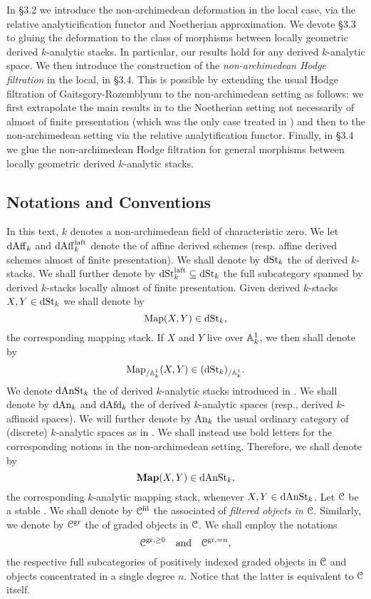 \documentclass[10pt,a4paper,reqno]{amsart} %
\theoremstyle{plain}
\theoremstyle{definition}
\theoremstyle{remark}
\numberwithin{equation}{section}
\begin{document}
In \S 3.2 we introduce the non-archimedean deformation in the local case, via the relative analyticification functor and Noetherian approximation. We
devote \S 3.3 to gluing the deformation to the class of morphisms between locally geometric derived $k$-analytic stacks. In particular, our results hold for any derived $k$-analytic space.
We then introduce the construction of the \emph{non-archimedean Hodge filtration} in the local, in \S 3.4. This is possible by extending the usual Hodge filtration of
Gaitsgory-Rozemblyum to the non-archimedean setting as follows: we first extrapolate the main results in \cite[\S 9.5]{Gaitsgory_Study_II} to the Noetherian setting
not necessarily of almost of finite presentation (which was the only case treated in \cite[\S 9]{Gaitsgory_Study_II}) and then to the non-archimedean setting via the relative analytification functor.
Finally, in \S 3.4 we glue the non-archimedean Hodge filtration for general morphisms between locally geometric derived $k$-analytic stacks.

\subsection{Notations and Conventions} In this text, $k$ denotes a non-archimedean field of characteristic zero. We let $\mathrm{dAff}_k$ and $\mathrm{dAff}_k^{\mathrm{laft}}$ denote
the \infcats of affine derived schemes (resp. affine derived schemes almost of finite presentation).
We shall denote by $\mathrm{dSt}_k$ the \infcat of derived $k$-stacks. 
We shall further denote by $\mathrm{dSt}^{\mathrm{laft}}_k \subseteq \mathrm{dSt}_k$ the full subcategory spanned by derived $k$-stacks locally almost of finite presentation.
Given derived $k$-stacks $X, Y \in \mathrm{dSt}_k$ we shall denote by
    \[
        \operatorname{Map}(X, Y) \in \mathrm{dSt}_k,    
    \]
the corresponding mapping stack. If $X$ and $Y$ live over $\mathbb A_k^1$, we then shall denote by
    \[
        \operatorname{Map}_{/ \mathbb A^1_k}(X, Y) \in (\mathrm{dSt}_k)_{/ \mathbb A^1_k}.  
    \]
We denote $\mathrm{dAnSt}_k$ the \infcat of derived $k$-analytic stacks introduced in \cite{Porta_Yu_Derived_non-archimedean_analytic_spaces}.
We shall denote by $\mathrm{dAn}_k$ and $\mathrm{dAfd}_k$ the \infcats of derived $k$-analytic spaces (resp., derived $k$-affinoid spaces). We will
further denote by $\mathrm{An}_k$ the usual ordinary category of (discrete) $k$-analytic spaces as in \cite{Berkovich_Etale_1993}.
We shall instead use bold letters for the corresponding notions in the non-archimedean setting. Therefore, we shall denote by
    \[
        \mathbf{Map}(X, Y) \in \mathrm{dAnSt}_k,
    \]
the corresponding $k$-analytic mapping stack, whenever $X, Y \in \mathrm{dAnSt}_k$.
Let $\mathcal C$ be a stable \infcat. We shall denote by $\mathcal C^{\mathrm{fil}}$ the associated \infcat of \emph{filtered objects in $\mathcal C$}.
Similarly, we denote by $\mathcal C^{\mathrm{gr}}$ the \infcat of graded objects in $\mathcal C$. We shall employ the notations
    \[
        \mathcal C^{\mathrm{gr}, \ge 0} \quad \mathrm{and} \quad \mathcal C^{\mathrm{gr} , =n}, 
    \]
the respective full subcategories of positively indexed graded objects in $\mathcal C$ and objects concentrated in a single degree $n$. Notice that the latter
\infcat is equivalent to $\mathcal C$ itself.
\end{document}
